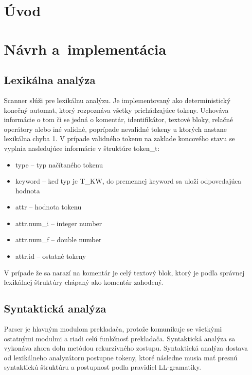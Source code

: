 \documentclass[a4paper, 11pt]{article}
\begin{document}
    \setcounter{page}{1}

    \section{Úvod}





    \section{Návrh a~implementácia}

    \subsection{Lexikálna analýza}
    Scanner slúži pre lexikálnu analýzu. Je implementovaný ako deterministický konečný automat, ktorý rozpoznáva všetky
    prichádzajúce tokeny. Uchováva informácie o tom či se jedná o komentár, identifikátor, textové bloky, relačné
    operátory alebo iné validné, poprípade nevalidné tokeny u ktorých nastane lexikálna chyba 1. V prípade validného
    tokenu na zaklade koncového stavu se vyplnia nasledujúce informácie v štruktúre token\_t:
    \begin{itemize}
        \item type  --  typ načítaného tokenu
        \item keyword -- keď typ je T\_KW, do premennej keyword sa uloží odpovedajúca hodnota
        \item attr -- hodnota tokenu
        \item attr.num\_i -- integer number
        \item attr.num\_f -- double number
        \item attr.id -- ostatné tokeny
    \end{itemize}
    V prípade že sa narazí na komentár je celý textový blok, ktorý je podľa správnej
    lexikálnej štruktúry chápaný ako komentár zahodený.


    \subsection{Syntaktická analýza}
    Parser je hlavným modulom prekladača, protože komunikuje se všetkými ostatnými modulmi
    a riadi celú funkčnosť prekladača. Syntaktická analýza sa vykonáva zhora dolu metódou
    rekurzivného zostupu.
    Syntaktická analýza dostava od lexikálneho analyzátoru postupne tokeny, ktoré následne musia
    mať presnú syntaktickú štruktúru a postupnosť podla pravidiel LL-gramatiky.
\end{document}
